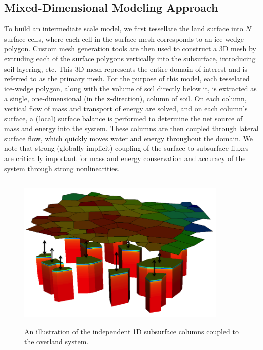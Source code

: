 \documentclass[review,11pt]{elsarticle}
\begin{document}
\subsection{Mixed-Dimensional Modeling Approach}
To build an intermediate scale model, we first tessellate the land surface into $N$ surface cells, where each cell in the surface mesh corresponds to an ice-wedge polygon.
Custom mesh generation tools are then used to construct a 3D mesh by extruding each of the surface polygons vertically into the subsurface, introducing soil layering, etc.
This 3D mesh represents the entire domain of interest and is referred to as the primary mesh.
For the purpose of this model, each tesselated ice-wedge polygon, along with the volume of soil directly below it, is extracted as a single, one-dimensional (in the z-direction), column of soil.
On each column, vertical flow of mass and transport of energy are solved, and on each column's surface, a (local) surface balance is performed to determine the net source of mass and energy into the system.
These columns are then coupled through lateral surface flow, which quickly moves water and energy throughout the domain.
We note that strong (globally implicit) coupling of the surface-to-subsurface fluxes are critically important for mass and energy conservation and accuracy of the system through strong nonlinearities.
%
\begin{figure}[!htpb]
\centering
\includegraphics[height = 7.5cm, width=10cm]{figures/mixed-dim-model.png}
\caption{An illustration of the independent 1D subsurface columns coupled to the overland system.}
\label{surf-cols}
\end{figure}
\end{document}
